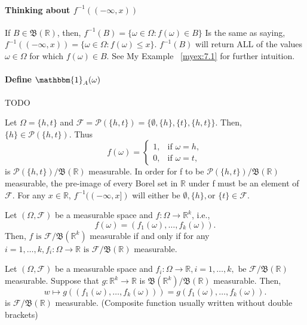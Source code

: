 \paragraph{Thinking about $f^{-1}((-\infty, x))$}%
\label{ta:7.1}
If $B \in  \mathfrak{B}(\mathbb{R})$, then,
$ f^{-1}(B) = \{\omega \in \Omega: f(\omega) \in B\} $
Is the same as saying,
$ f^{-1}((-\infty, x)) = \{\omega \in \Omega: f(\omega) \le x\} $. $f^{-1}(B)$ will return ALL of the values $\omega \in \Omega$ 
for which $f(\omega) \in B$. See My Example ~\ref{myex:7.1} for further intuition.


\paragraph{Define $\mathbbm{1}_A(\omega)$} TODO
\label{}

\begin{example}
    \label{ex:7.3}
    Let $\Omega = \{h, t\}$ and $\mathcal{F} = \mathcal{P}(\{h, t\}) = \{\emptyset, \{h\}, \{t\}, \{h, t\} \} $. Then,
    $\{h\} \in \mathcal{P}(\{h, t\}) $. Thus
    \[
    f(\omega) = 
    \begin{cases}
        1, & \text{if } \omega = h, \\
        0, & \text{if } \omega =t,
    \end{cases}
    \]
    is $\mathcal{P}(\{h, t\})/{\mathfrak{B}(\mathbb{R})}$ measurable.
    In order for f to be $\mathcal{P}(\{h, t\})/{\mathfrak{B}(\mathbb{R})}$ measurable, the pre-image of every
    Borel set in $\mathbb{R}$ under f must be an element of $\mathcal{F}$. For any $x \in \mathbb{R}$,
    $f^{-1}((-\infty, x])$ will either be $\emptyset, \{h\}, \text{or } \{t\} \in \mathcal{F}$. 
\end{example}

\begin{proposition}
    \label{prop:7.4}
    Let $(\Omega, \mathcal{F})$ be a measurable space and $f: \Omega \to \mathbb{R}^{k}$, i.e.,
    \[
    f(\omega) = (f_1(\omega), \ldots, f_k(\omega))
    .\] 
    Then, $f \text{ is } \mathcal{F}/\mathfrak{B}(\mathbb{R}^{k})$ measurable if and only if for any
    $i = 1, \ldots, k, f_i: \Omega \to \mathbb{R} \text{ is } \mathcal{F}/\mathfrak{B}(\mathbb{R})$ measurable.
\end{proposition}

\begin{proposition}
    \label{prop:7.5}
    Let $(\Omega, \mathcal{F})$ be a measurable space and $f_i: \Omega \to \mathbb{R}, i = 1, \ldots, k, \text{ be }
    \mathcal{F}/\mathfrak{B}(\mathbb{R})$ measurable. Suppose that $g: \mathbb{R}^{k} \to \mathbb{R}$ is
    $\mathfrak{B}(\mathbb{R}^{k})/\mathfrak{B}(\mathbb{R})$ measurable. Then,
    \[
    w \mapsto g((f_1(\omega), \ldots, f_k(\omega))) = g(f_1(\omega), \ldots, f_k(\omega))
    .\] 
    is $\mathcal{F}/\mathfrak{B}(\mathbb{R})$ measurable. (Composite function usually written without double brackets)
\end{proposition}

